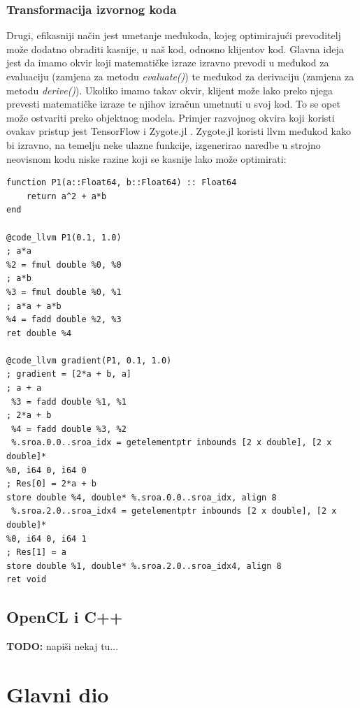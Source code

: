 \documentclass[zavrsnirad]{fer}
\begin{document}
\subsection{Transformacija izvornog koda}

Drugi, efikasniji način jest umetanje međukoda, kojeg optimirajući prevoditelj može dodatno obraditi kasnije, u naš kod, odnosno klijentov kod. Glavna ideja jest da imamo okvir koji matematičke izraze izravno prevodi u međukod za evaluaciju (zamjena za metodu \textit{evaluate()}) te međukod za derivaciju (zamjena za metodu \textit{derive()}). Ukoliko imamo takav okvir, klijent može lako preko njega prevesti matematičke izraze te njihov izračun umetnuti u svoj kod. To se opet može ostvariti preko objektnog modela. Primjer razvojnog okvira koji koristi ovakav pristup jest TensorFlow i Zygote.jl \cite{prague:diffcpp}. Zygote.jl koristi llvm međukod kako bi izravno, na temelju neke ulazne funkcije, izgenerirao naredbe u strojno neovisnom kodu niske razine koji se kasnije lako može optimirati:
\\

\begin{lstlisting}[caption={Primjer korištenja Zygote.jl za generiranje llvm međukoda za funkciju: $a^2 + a*b$ \cite{prague:diffcpp}}]
function P1(a::Float64, b::Float64) :: Float64 
    return a^2 + a*b 
end

@code_llvm P1(0.1, 1.0) 
; a*a 
%2 = fmul double %0, %0 
; a*b 
%3 = fmul double %0, %1 
; a*a + a*b 
%4 = fadd double %2, %3 
ret double %4 
 
@code_llvm gradient(P1, 0.1, 1.0) 
; gradient = [2*a + b, a] 
; a + a 
 %3 = fadd double %1, %1 
; 2*a + b 
 %4 = fadd double %3, %2 
 %.sroa.0.0..sroa_idx = getelementptr inbounds [2 x double], [2 x double]* 
%0, i64 0, i64 0 
; Res[0] = 2*a + b 
store double %4, double* %.sroa.0.0..sroa_idx, align 8 
 %.sroa.2.0..sroa_idx4 = getelementptr inbounds [2 x double], [2 x double]* 
%0, i64 0, i64 1 
; Res[1] = a  
store double %1, double* %.sroa.2.0..sroa_idx4, align 8 
ret void
\end{lstlisting}

\pagebreak
\section{OpenCL i C++}
\textbf{TODO:} napiši nekaj tu...
\\
\blindtext


\chapter{Glavni dio}
\label{pog:glavni_dio}
\end{document}
